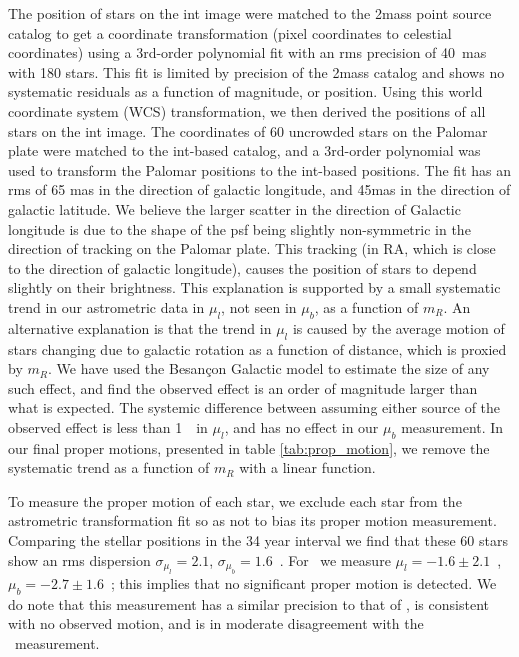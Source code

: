 The position of stars on the \gls{int} image were matched to
the \gls{2mass} point source catalog \citep{2006AJ....131.1163S} to get a coordinate 
transformation (pixel coordinates to celestial coordinates) using a
3rd-order polynomial fit with an \gls{rms} precision of 40~mas with 180 stars. This fit is limited by precision of the \gls{2mass} catalog and shows no systematic residuals as a function of magnitude, or position.  Using this  world coordinate system (WCS) transformation, we then derived the
positions of all stars on the \gls{int} image. The coordinates of 60 uncrowded
stars on the Palomar plate were matched to the \gls{int}-based catalog, and a 3rd-order polynomial was used to transform the Palomar positions to the \gls{int}-based positions. The fit has an \gls{rms} of 65 mas in the direction of galactic longitude, and 45mas in the direction of galactic latitude.  We believe the larger scatter in the direction of  Galactic longitude is due to the shape of the \gls{psf} being slightly non-symmetric in the direction of tracking on the Palomar plate. This tracking (in RA, which is close to the direction of galactic longitude), causes the position of stars to depend slightly on their brightness. This explanation is supported by  a small systematic trend in our astrometric data in $\mu_l$, not seen in $\mu_b$, as a function of $m_R$.  An alternative explanation is that the  trend in $\mu_l$ is caused by the average motion of stars changing due to galactic rotation as a function of distance, which is proxied by $m_R$.  We have used the Besan\c{c}on Galactic model \citep{2003A&A...409..523R} to estimate the size of any such effect, and find the observed effect is an order of magnitude larger than what is expected. The systemic difference between assuming either source of the observed effect is less than 1~\masyr\ in $\mu_l$, and has no effect in our $\mu_b$ measurement. In our final proper motions, presented in table \ref{tab:prop_motion}, we remove  the systematic trend as a function of $m_R$ with a linear function.

To measure the proper motion of each star, we exclude each star from the astrometric transformation fit
so as not to bias its proper motion measurement.  Comparing the stellar positions in the 34 year interval we find that these 60 stars show an \gls{rms} dispersion  $\sigma_{\mu_l} = 2.1$\masyr, $\sigma_{\mu_b} =1.6$~\masyr. For
\starg\ we measure $\mu_l = -1.6 \pm 2.1$~\masyr, $\mu_b = -2.7 \pm 1.6$~\masyr; this implies that no significant proper motion is detected. We do note that this measurement has a similar precision to
that of \rl, is consistent with no observed motion, and is in moderate disagreement with the \rl\ measurement.


